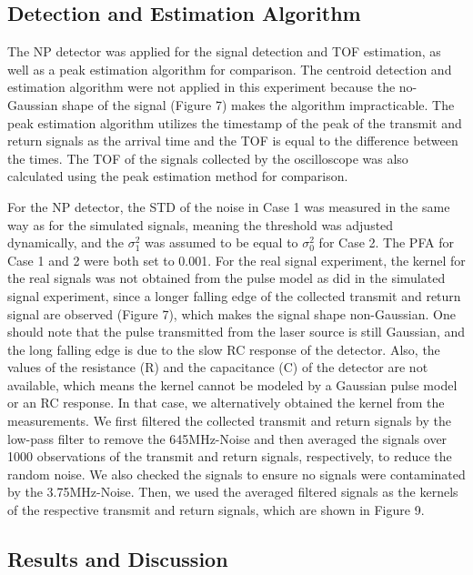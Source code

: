 \subsection{Detection and Estimation Algorithm}
The NP detector was applied for the signal detection and TOF estimation, as well as a peak estimation algorithm for comparison. The centroid detection and estimation algorithm were not applied in this experiment because the no-Gaussian shape of the signal (Figure 7) makes the algorithm impracticable. The peak estimation algorithm utilizes the timestamp of the peak of the transmit and return signals as the arrival time and the TOF is equal to the difference between the times. The TOF of the signals collected by the oscilloscope was also calculated using the peak estimation method for comparison.\par
For the NP detector, the STD of the noise in Case 1 was measured in the same way as for the simulated signals, meaning the threshold was adjusted dynamically, and the $\sigma^2_1$ was assumed to be equal to $\sigma^2_0$ for Case 2. The PFA for Case 1 and 2 were both set to 0.001. For the real signal experiment, the kernel for the real signals was not obtained from the pulse model as did in the simulated signal experiment, since a longer falling edge of the collected transmit and return signal are observed (Figure 7), which makes the signal shape non-Gaussian. One should note that the pulse transmitted from the laser source is still Gaussian, and the long falling edge is due to the slow RC response of the detector. Also, the values of the resistance (R) and the capacitance (C) of the detector are not available, which means the kernel cannot be modeled by a Gaussian pulse model or an RC response. In that case, we alternatively obtained the kernel from the measurements. We first filtered the collected transmit and return signals by the low-pass filter to remove the 645MHz-Noise and then averaged the signals over 1000 observations of the transmit and return signals, respectively, to reduce the random noise. We also checked the signals to ensure no signals were contaminated by the 3.75MHz-Noise. Then, we used the averaged filtered signals as the kernels of the respective transmit and return signals, which are shown in Figure 9. 
\subsection{Results and Discussion}
